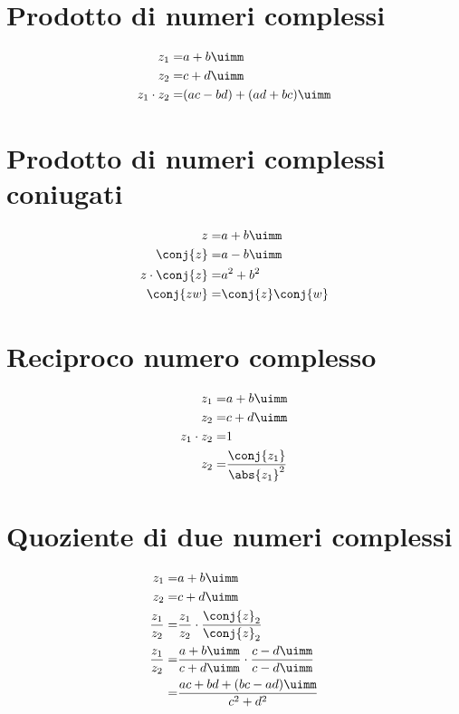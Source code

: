 \section{Prodotto di numeri complessi}
\begin{align*}
z_1=&a+b\uimm\\
z_2=&c+d\uimm\\
z_1\cdot z_2=&(ac-bd)+(ad+bc)\uimm
\end{align*}
\section{Prodotto di numeri complessi coniugati}
\begin{align*}
z=&a+b\uimm\\
\conj{z}=&a-b\uimm\\
z\cdot\conj{z}=&a^2+b^2\\
\conj{zw}=&\conj{z}\conj{w}
\end{align*}
\section{Reciproco numero complesso }
\begin{align*}
z_1=&a+b\uimm\\
z_2=&c+d\uimm\\
z_1\cdot z_2=&1\\
z_2=&\dfrac{\conj{z_1}}{\abs{z_1}^2}\\
\end{align*}
\section{Quoziente di due numeri complessi}
\begin{align*}
z_1=&a+b\uimm\\
z_2=&c+d\uimm\\
\dfrac{z_1}{z_2}=&\dfrac{z_1}{z_2}\cdot\dfrac{\conj{z}_2}{\conj{z}_2}\\
\dfrac{z_1}{z_2}=&\dfrac{a+b\uimm}{c+d\uimm}\cdot\dfrac{c-d\uimm}{c-d\uimm}\\
=&\dfrac{ac+bd+(bc-ad)\uimm}{c^2+d^2}
\end{align*}
